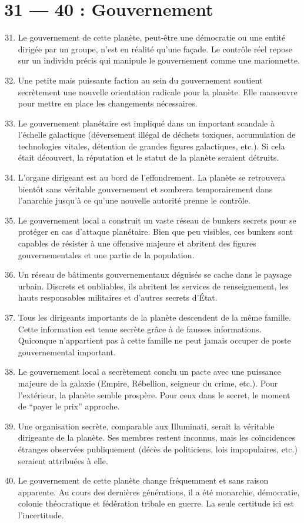 \documentclass{article}
\begin{document}
\section*{31 --- 40 : Gouvernement}
\begin{enumerate}
	\setcounter{enumi}{30}
	\item Le gouvernement de cette planète, peut-être une démocratie ou une entité dirigée par un groupe, n’est en réalité qu’une façade. Le contrôle réel repose sur un individu précis qui manipule le gouvernement comme une marionnette.
	\item Une petite mais puissante faction au sein du gouvernement soutient secrètement une nouvelle orientation radicale pour la planète. Elle manœuvre pour mettre en place les changements nécessaires.
	\item Le gouvernement planétaire est impliqué dans un important scandale à l’échelle galactique (déversement illégal de déchets toxiques, accumulation de technologies vitales, détention de grandes figures galactiques, etc.). Si cela était découvert, la réputation et le statut de la planète seraient détruits.
	\item L’organe dirigeant est au bord de l’effondrement. La planète se retrouvera bientôt sans véritable gouvernement et sombrera temporairement dans l’anarchie jusqu’à ce qu’une nouvelle autorité prenne le contrôle.
	\item Le gouvernement local a construit un vaste réseau de bunkers secrets pour se protéger en cas d’attaque planétaire. Bien que peu visibles, ces bunkers sont capables de résister à une offensive majeure et abritent des figures gouvernementales et une partie de la population.
	\item Un réseau de bâtiments gouvernementaux déguisés se cache dans le paysage urbain. Discrets et oubliables, ils abritent les services de renseignement, les hauts responsables militaires et d’autres secrets d’État.
	\item Tous les dirigeants importants de la planète descendent de la même famille. Cette information est tenue secrète grâce à de fausses informations. Quiconque n’appartient pas à cette famille ne peut jamais occuper de poste gouvernemental important.
	\item Le gouvernement local a secrètement conclu un pacte avec une puissance majeure de la galaxie (Empire, Rébellion, seigneur du crime, etc.). Pour l’extérieur, la planète semble prospère. Pour ceux dans le secret, le moment de “payer le prix” approche.
	\item Une organisation secrète, comparable aux Illuminati, serait la véritable dirigeante de la planète. Ses membres restent inconnus, mais les coïncidences étranges observées publiquement (décès de politiciens, lois impopulaires, etc.) seraient attribuées à elle.
	\item Le gouvernement de cette planète change fréquemment et sans raison apparente. Au cours des dernières générations, il a été monarchie, démocratie, colonie théocratique et fédération tribale en guerre. La seule certitude ici est l’incertitude.
\end{enumerate}
\end{document}
